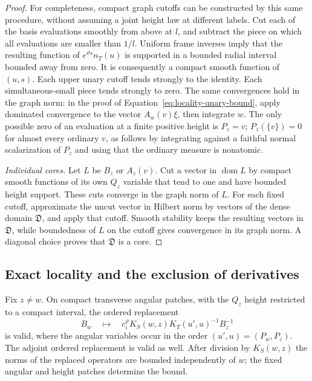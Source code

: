 \begin{proof}
For completeness, compact graph cutoffs can be constructed by this
same procedure, without assuming a joint height law at different
labels.  Cut each of the basis evaluations smoothly from above at
$l$, and subtract the piece on which all evaluations are smaller
than $1/l$.  Uniform frame inverses imply that the resulting
function of $e^{\vartheta s}n_T(u)$ is supported in a bounded radial
interval bounded away from zero.  It is consequently a compact
smooth function of $(u,s)$.  Each upper unary cutoff tends strongly
to the identity.  Each simultaneous-small piece tends strongly to
zero.  The same convergences hold in the graph norm: in the proof of
Equation~\eqref{eq:locality-unary-bound}, apply dominated convergence
to the vector $A_w(v)\xi$, then integrate $w$.  The only possible
zero of an evaluation at a finite positive height is $P_z= v$;
$P_z(\{v\})=0$ for almost every ordinary $v$, as follows by integrating
against a faithful normal scalarization of $P_z$ and using that the
ordinary measure is nonatomic.

\emph{Individual cores.}
Let $L$ be $B_z$ or $A_z(v)$.  Cut a
vector in $\operatorname{dom} L$ by compact smooth functions of its own $Q_z$
variable that tend to one and have bounded height support.  These
cuts converge in the graph norm of $L$.  For each fixed cutoff,
approximate the uncut vector in Hilbert norm by vectors of the dense
domain $\mathfrak D$, and apply that cutoff.  Smooth stability keeps
the resulting vectors in $\mathfrak D$, while boundedness of $L$
on the cutoff gives convergence in its graph norm.  A diagonal
choice proves that $\mathfrak D$ is a core.
\end{proof}

\subsection{Exact locality and the exclusion of derivatives}

\begin{lemma}
\label{lem:locality-real-substitution}
Fix $z\ne w$.  On compact transverse angular patches, with the
$Q_z$ height restricted to a compact interval, the ordered
replacement
\[
 B_w\quad\longmapsto\quad
 c_i^\vartheta K_S(w,z)K_T(u',u)^{-1}B_z^{-1}
\]
is valid, where the angular variables occur in the order
$(u',u)=(P_w,P_z)$.  The adjoint ordered replacement is valid as
well.  After division by $K_S(w,z)$ the norms of the replaced
operators are bounded independently of $w$; the fixed angular and
height patches determine the bound.
\end{lemma}

